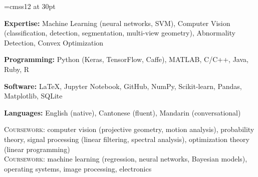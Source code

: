 \documentclass[letterpaper, 12pt]{cv_style}
\begin{document}
\font\titlefont=cmss12 at 30pt



\begin{ditem}
	\item \textbf{Expertise:} Machine Learning (neural networks, SVM), Computer Vision (classification, detection, segmentation, multi-view geometry), Abnormality Detection, Convex Optimization
	\item \textbf{Programming:} Python (Keras, TensorFlow, Caffe), MATLAB, C/C++, Java, Ruby, R
	\item \textbf{Software:} \LaTeX, Jupyter Notebook, GitHub, NumPy, Scikit-learn, Pandas, Matplotlib, SQLite
	\item \textbf{Languages:} English (native), Cantonese (fluent), Mandarin (conversational)
\end{ditem}

\flushleft{}
\medspace
\textsc{Coursework:} computer vision (projective geometry, motion analysis), probability theory, signal processing (linear filtering, spectral analysis), optimization theory (linear programming)\\
\medspace
{}
\medspace
\textsc{Coursework:} machine learning (regression, neural networks, Bayesian models), operating systems, image processing, electronics
\medspace
\end{document}

